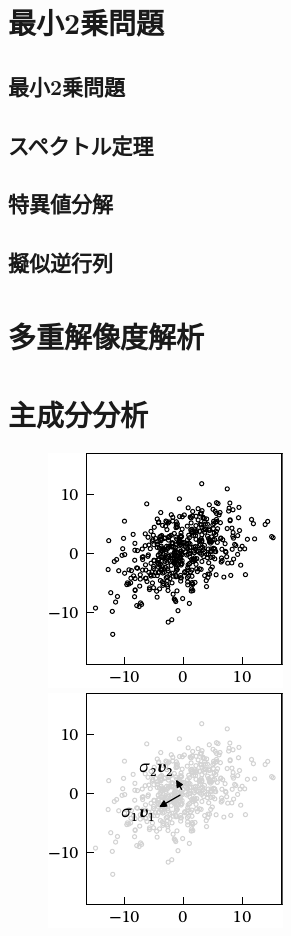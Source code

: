 \documentclass[../../main]{subfiles}
\begin{document}
\section{最小2乗問題}

\subsection{最小2乗問題}

\subsection{スペクトル定理}

\subsection{特異値分解}

\subsection{擬似逆行列}

\section{多重解像度解析}

\section{主成分分析}

\begin{figure}[htbp]
  \begin{minipage}{\linewidth/2}
    \centering
    \includegraphics{scatter.pdf}
  \end{minipage}%
  \begin{minipage}{\linewidth/2}
    \centering
    \includegraphics{pca.pdf}
  \end{minipage}
\end{figure}
\end{document}
